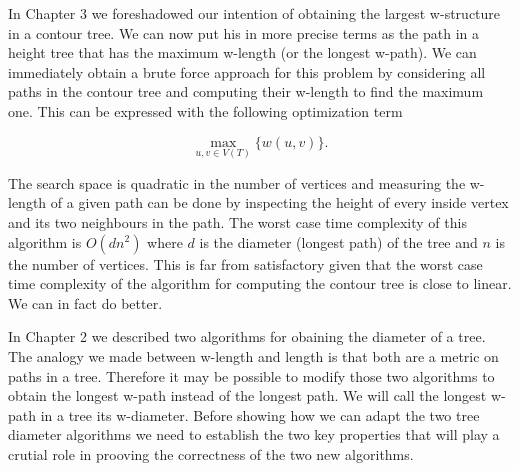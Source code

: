In Chapter 3 we foreshadowed our intention of obtaining the largest w-structure in a contour tree. We can now put his in more precise terms as the path in a height tree that has the maximum w-length (or the longest w-path). We can immediately obtain a brute force approach for this problem by considering all paths in the contour tree and computing their w-length to find the maximum one. This can be expressed with the following optimization term

\begin{equation}
    \label{eq:brute-force}
    \max_{u, v \in V(T)}\{ w(u, v) \} .
\end{equation}

The search space is quadratic in the number of vertices and measuring the w-length of a given path can be done by inspecting the height of every inside vertex and its two neighbours in the path. The worst case time complexity of this algorithm is $O(dn^2)$ where $d$ is the diameter (longest path) of the tree and $n$ is the number of vertices. This is far from satisfactory given that the worst case time complexity of the algorithm for computing the contour tree is close to linear. We can in fact do better.


In Chapter 2 we described two algorithms for obaining the diameter of a tree. The analogy we made between w-length and length is that both are a metric on paths in a tree. Therefore it may be possible to modify those two algorithms to obtain the longest w-path instead of the longest path. We will call the longest w-path in a tree its w-diameter. Before showing how we can adapt the two tree diameter algorithms we need to establish the two key properties that will play a crutial role in prooving the correctness of the two new algorithms.


